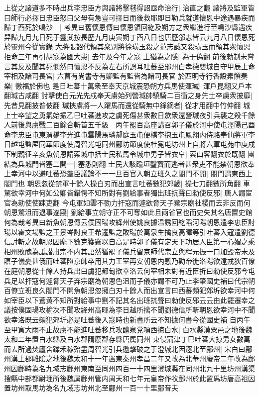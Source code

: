 上從之諸道多不時出兵李忠臣方與諸將擊毬得詔亟命治行|{
	治直之翻}
諸將及監軍皆曰師行必擇日忠臣怒曰父母有急豈可擇日而後救耶即日勒兵就道懷恩中途遇暴疾而歸丁酉死於鳴沙　|{
	考異曰舊懷恩傳曰懷恩領回紇及朔方之衆繼進行至鳴沙縣遇疾舁歸九月九日死于靈武按長歷九月庚寅朔丁酉八日也唐歷邠志皆云九月八日懷恩死於靈州今從實錄}
大將張韶代領其衆别將徐璜玉殺之范志誠又殺璜玉而領其衆懷恩拒命三年再引胡寇為國大患|{
	去年及今年之寇}
上猶為之隱|{
	為于偽翻}
前後勑制未嘗言其反及聞其死憫然曰懷恩不反為左右所誤耳吐蕃至邠州白孝德嬰城自守甲辰上命宰相及諸司長宫|{
	六曹有尚書寺有卿監有監皆為諸司長官}
於西明寺行香設素饌奏樂|{
	徼福於佛也}
是日吐蕃十萬衆至奉天京城震恐朔方兵馬使渾瑊|{
	渾戶昆翻又戶本翻瑊古咸翻}
討擊使白元光先戍奉天虜始列營瑊帥驍騎二百衝之身先士卒虜衆披靡|{
	先昔見翻披普佊翻}
瑊挾虜將一人躍馬而還從騎無中鋒鏑者|{
	從才用翻中竹仲翻}
城上士卒望之勇氣始振乙巳吐蕃進攻之虜死傷甚衆數日歛衆還營瑊夜引兵襲之殺千餘人前後與虜戰二百餘合斬首五千級　丙午罷百高座講召郭子儀於河中使屯涇陽己酉命李忠臣屯東渭橋李光進屯雲陽馬璘郝庭玉屯便橋李抱玉屯鳳翔内侍駱奉仙將軍李日越屯盩厔同華節度使周智光屯同州鄜坊節度使杜冕屯坊州上自將六軍屯苑中庚戍下制親征辛亥魚朝恩請索城中括士民私馬令城中男子皆衣皁|{
	索山客翻衣於既翻}
團結為兵城門皆塞二開一|{
	塞悉則翻}
士民大駭踰垣鑿竇而逃者甚衆吏不能禁朝恩欲奉上幸河中以避吐蕃恐羣臣議論不一一旦百官入朝立班久之閤門不開|{
	閤門謂東西上閤門也}
朝恩忽從禁軍十餘人操白刃而出宣言吐蕃數犯郊畿|{
	操七刀翻數所角翻}
車駕欲幸河中何如公卿皆錯愕不知所對有劉給事者獨出班抗聲曰勑使反邪|{
	唐人謂宦官為勑使使踈吏翻}
今屯軍如雲不勠力扞寇而遽欲脅天子棄宗廟社稷而去非反而何朝恩驚沮而退事遂寢|{
	劉給事立朝守正不可奪如此且兩省官也而史失其名唐置史館何為哉考異曰新魚朝恩傳云僕固瑒攻絳州使姚良據温誘回紇䧟河陽朝恩遣李忠臣討瑒以霍文場監之王景岑討良王希遷監之敗瑒於萬泉生擒良高暉等引吐蕃入寇遣劉德信討斬之故朝恩因麾下數克獲竊以自高是時郭子儀有定天下功居人臣第一心媢之乘相州敗醜為詆譛肅宗不内其語然猶罷子儀兵留京師代宗立與程元振一口加毀帝未及寤子儀憂甚俄而吐蕃陷京師卒用其力王室再安朝恩内慙乃勸帝徙洛陽欲遠戎狄百僚在庭朝恩從十餘人持兵出曰虜犯都甸欲幸洛云何宰相未對有近臣折曰勑使反邪今屯兵足以扞寇何遽脅天子弃宗廟為朝恩色沮而子儀亦謂不可乃止李肇國史補曰代宗朝百僚立班良久閤門不開魚朝恩忽擁白刃十餘人而出宣言曰西蕃頻犯郊圻欲幸河中何如宰臣以下蒼黄不知所對給事中劉不記其名出班抗聲曰勑使反邪云云由此罷遷幸之議按僕固瑒攻榆次不聞攻絳州高暉為李日越所擒不聞劉德信所斬朝恩欲幸河中不聞欲幸洛既云頻犯郊圻必是吐蕃後入寇時也新書所云不知據何書今從國史補}
自丙午至甲寅大雨不止故虜不能進吐蕃移兵攻醴泉党項西掠白水|{
	白水縣漢粟邑之地後魏太和二年置白水縣及白水郡隋廢郡存縣唐属同州}
東侵蒲津丁巳吐蕃大掠男女數萬而去所過焚廬舍蹂禾稼殆盡周智光引兵邀擊破之于澄城北因逐北至鄜州|{
	宋白曰鄜州漢上郡雕隂之地後魏太和十一年置東秦州孝昌二年又改為北華州廢帝二年改為鄜州因鄜畤為名九域志鄜州東南至同州四百一十四里澄城縣在同州北九十里坊州漢渠搜縣中部都尉理所後魏属鄜州管内周天和七年元皇帝作牧鄜州於此置馬坊唐高祖因置坊州取馬坊為名九域志坊州北至鄜州一百一十里鄜音夫}
